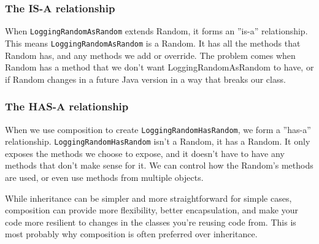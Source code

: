 \documentclass[a4paper]{scrreprt}
\begin{document}
\subsubsection*{The IS-A relationship}
When
\texttt{LoggingRandomAsRandom} extends Random, it forms an ''is-a'' relationship.
This means
\texttt{LoggingRandomAsRandom} is a Random.
It has all the methods that Random has, and any methods we add or override.
The problem comes when Random has a method that we don't want LoggingRandomAsRandom to have, or if Random changes in a future Java version in a way that breaks our class.

\subsubsection*{The HAS-A relationship}
When we use composition to create
\texttt{LoggingRandomHasRandom}, we form a ''has-a'' relationship.
\texttt{LoggingRandomHasRandom} isn't a Random, it has a Random.
It only exposes the methods we choose to expose, and it doesn't have to have any methods that don't make sense for it.
We can control how the Random's methods are used, or even use methods from multiple objects.

While inheritance can be simpler and more straightforward for simple cases, composition can provide more flexibility, better encapsulation, and make your code more resilient to changes in the classes you're reusing code from.
This is most probably why composition is often preferred over inheritance.

%

\listoflistings %
\printbibliography
\end{document}
